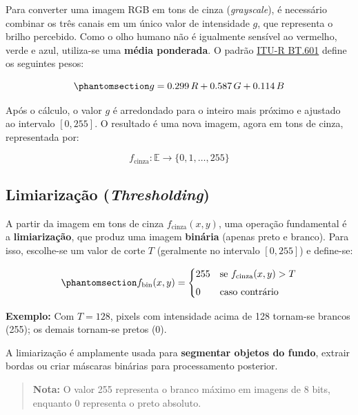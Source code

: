 \documentclass[
  portuguese,
  letterpaper,
  openany,
  oneside,
  12pt,
  a4paper]{book}
\begin{document}
Para converter uma imagem RGB em tons de cinza (\emph{grayscale}), é
necessário combinar os três canais em um único valor de intensidade
\(g\), que representa o brilho percebido. Como o olho humano não é
igualmente sensível ao vermelho, verde e azul, utiliza-se uma
\textbf{média ponderada}. O padrão
\href{https://www.itu.int/rec/R-REC-BT.601/}{ITU-R BT.601}
\autocite{itu_bt601} define os seguintes pesos:

\begin{equation}\phantomsection\label{eq-1-cinza}{
g = 0.299\,R + 0.587\,G + 0.114\,B 
}\end{equation}

Após o cálculo, o valor \(g\) é arredondado para o inteiro mais próximo
e ajustado ao intervalo \([0, 255]\). O resultado é uma nova imagem,
agora em tons de cinza, representada por:

\[
f_{\text{cinza}}: \mathbb{E} \to \{0,1,\dots,255\}
\]

\subsection*{\texorpdfstring{Limiarização
(\emph{Thresholding})}{Limiarização (Thresholding)}}\label{limiarizauxe7uxe3o-thresholding}

A partir da imagem em tons de cinza \(f_{\text{cinza}}(x,y)\), uma
operação fundamental é a \textbf{limiarização}, que produz uma imagem
\textbf{binária} (apenas preto e branco). Para isso, escolhe-se um valor
de corte \(T\) (geralmente no intervalo \([0,255]\)) e define-se:

\begin{equation}\phantomsection\label{eq-1-limiar}{
f_{\text{bin}}(x,y) = 
\begin{cases} 
255 & \text{se } f_{\text{cinza}}(x,y) > T \\[4pt]
0 & \text{caso contrário}
\end{cases}
}\end{equation}

\textbf{Exemplo:} Com \(T = 128\), pixels com intensidade acima de 128
tornam-se brancos (255); os demais tornam-se pretos (0).

A limiarização é amplamente usada para \textbf{segmentar objetos do
fundo}, extrair bordas ou criar máscaras binárias para processamento
posterior.

\begin{quote}
\textbf{Nota:} O valor 255 representa o branco máximo em imagens de 8
bits, enquanto 0 representa o preto absoluto.
\end{quote}
\end{document}

